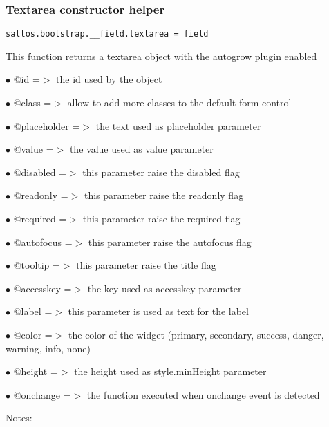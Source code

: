 \documentclass[a4paper]{article}
\begin{document}
\hypertarget{toc616}{}
\subsubsection{Textarea constructor helper}

\begin{lstlisting}
saltos.bootstrap.__field.textarea = field
\end{lstlisting}

This function returns a textarea object with the autogrow plugin enabled

\begin{compactitem}
\item[\color{myblue}$\bullet$] @id          =$>$ the id used by the object
\item[\color{myblue}$\bullet$] @class       =$>$ allow to add more classes to the default form-control
\item[\color{myblue}$\bullet$] @placeholder =$>$ the text used as placeholder parameter
\item[\color{myblue}$\bullet$] @value       =$>$ the value used as value parameter
\item[\color{myblue}$\bullet$] @disabled    =$>$ this parameter raise the disabled flag
\item[\color{myblue}$\bullet$] @readonly    =$>$ this parameter raise the readonly flag
\item[\color{myblue}$\bullet$] @required    =$>$ this parameter raise the required flag
\item[\color{myblue}$\bullet$] @autofocus   =$>$ this parameter raise the autofocus flag
\item[\color{myblue}$\bullet$] @tooltip     =$>$ this parameter raise the title flag
\item[\color{myblue}$\bullet$] @accesskey   =$>$ the key used as accesskey parameter
\item[\color{myblue}$\bullet$] @label       =$>$ this parameter is used as text for the label
\item[\color{myblue}$\bullet$] @color       =$>$ the color of the widget (primary, secondary, success, danger, warning, info, none)
\item[\color{myblue}$\bullet$] @height      =$>$ the height used as style.minHeight parameter
\item[\color{myblue}$\bullet$] @onchange    =$>$ the function executed when onchange event is detected
\end{compactitem}

Notes:
\end{document}
